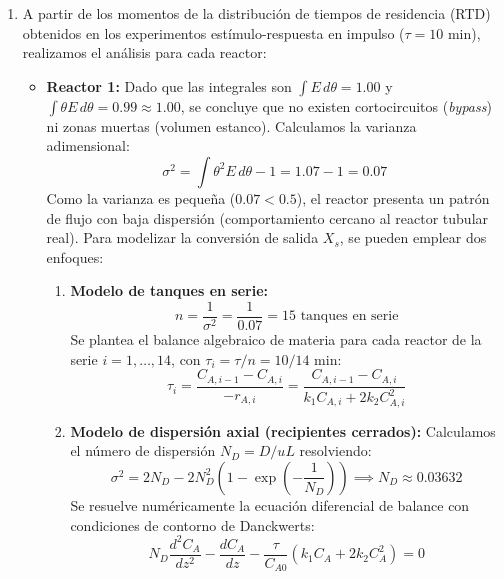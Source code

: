 \solve{}
\begin{enumerate}[label={\alph*)}]
	\item A partir de los momentos de la distribución de tiempos de residencia (RTD) obtenidos en los experimentos estímulo-respuesta en impulso ($\tau = 10$ min), realizamos el análisis para cada reactor:
	      \begin{itemize}
		      \item \textbf{Reactor 1:}
		            Dado que las integrales son $\int E \, d\theta = 1.00$ y $\int \theta E \, d\theta = 0.99 \approx 1.00$, se concluye que no existen cortocircuitos (\textit{bypass}) ni zonas muertas (volumen estanco).
		            Calculamos la varianza adimensional:
		            \begin{equation*}
			            \sigma^2 = \int \theta^2 E \, d\theta - 1 = 1.07 - 1 = 0.07
		            \end{equation*}
		            Como la varianza es pequeña ($0.07 < 0.5$), el reactor presenta un patrón de flujo con baja dispersión (comportamiento cercano al reactor tubular real).
		            Para modelizar la conversión de salida $X_s$, se pueden emplear dos enfoques:
		            \begin{enumerate}[label={\arabic*.}]
			            \item \textbf{Modelo de tanques en serie:}
			                  \begin{equation*}
				                  n = \frac{1}{\sigma^2} = \frac{1}{0.07} = 15 \text{ tanques en serie}
			                  \end{equation*}
			                  Se plantea el balance algebraico de materia para cada reactor de la serie $i = 1, \dots, 14$, con $\tau_i = \tau/n = 10/14 \text{ min}$:
			                  \begin{equation*}
				                  \tau_i = \frac{C_{A,i-1} - C_{A,i}}{-r_{A,i}} = \frac{C_{A,i-1} - C_{A,i}}{k_1 C_{A,i} + 2 k_2 C_{A,i}^2}
			                  \end{equation*}
			            \item \textbf{Modelo de dispersión axial (recipientes cerrados):}
			                  Calculamos el número de dispersión $N_D = D/uL$ resolviendo:
			                  \begin{equation*}
				                  \sigma^2 = 2 N_D - 2 N_D^2 \left( 1 - \exp\left(-\frac{1}{N_D}\right) \right) \implies N_D \approx 0.03632
			                  \end{equation*}
			                  Se resuelve numéricamente la ecuación diferencial de balance con condiciones de contorno de Danckwerts:
			                  \begin{equation*}
				                  N_D \frac{d^2 C_A}{dz^2} - \frac{dC_A}{dz} - \frac{\tau}{C_{A0}} (k_1 C_A + 2 k_2 C_A^2) = 0
			                  \end{equation*}
		            \end{enumerate}


\end{itemize}
\end{enumerate}
